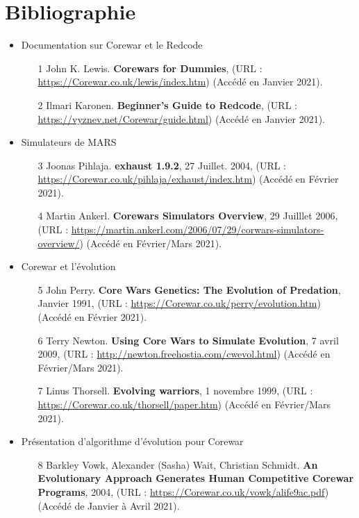 \documentclass[french]{article}
\begin{document}
\newpage
\section{Bibliographie}
    \begin{itemize}
        \item Documentation sur Corewar et le Redcode
        \begin{itemize}
            \item [1] John K. Lewis. \textbf{Corewars for Dummies}, (URL : \url{https://Corewar.co.uk/lewis/index.htm}) (Accédé en Janvier 2021).
            \item [2] Ilmari Karonen.  \textbf{Beginner's Guide to Redcode}, (URL : \url{https://vyznev.net/Corewar/guide.html}) (Accédé en Janvier 2021).\\
        \end{itemize}
        \item Simulateurs de MARS
        \begin{itemize}
            \item [3] Joonas Pihlaja.  \textbf{exhaust 1.9.2}, 27 Juillet. 2004,  (URL : \url{https://Corewar.co.uk/pihlaja/exhaust/index.htm}) (Accédé en Février 2021).
            \item [4] Martin Ankerl.  \textbf{Corewars Simulators Overview}, 29 Juilllet 2006,  (URL : \url{https://martin.ankerl.com/2006/07/29/corwars-simulators-overview/}) (Accédé en Février/Mars 2021). \\
        \end{itemize}
        \item Corewar et l'évolution
        \begin{itemize}
            \item [5] John Perry.  \textbf{Core Wars Genetics: The Evolution of Predation}, Janvier 1991,  (URL : \url{https://Corewar.co.uk/perry/evolution.htm}) (Accédé en Février 2021).
            \item [6] Terry Newton.  \textbf{Using Core Wars to Simulate Evolution}, 7 avril 2009,  (URL : \url{http://newton.freehostia.com/cwevol.html}) (Accédé en Février/Mars 2021).
            \item [7] Linus Thorsell.  \textbf{Evolving warriors}, 1 novembre 1999,  (URL : \url{https://Corewar.co.uk/thorsell/paper.htm}) (Accédé en Février/Mars 2021).\\
        \end{itemize}
        \item Présentation d'algorithme d'évolution pour Corewar
        \begin{itemize}
            \item [8] Barkley Vowk, Alexander (Sasha) Wait, Christian Schmidt. \textbf{An Evolutionary Approach Generates Human Competitive Corewar Programs}, 2004,  (URL : \url{https://Corewar.co.uk/vowk/alife9ac.pdf}) (Accédé de Janvier à Avril 2021).
        \end{itemize}
    \end{itemize}
\end{document}
